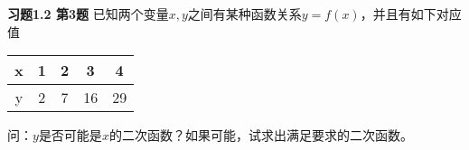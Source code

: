 
\renewcommand{\newpageorvspace}{\newpage}

\date{2022-09-09  第一次习题课}
\author{}



\maketitle

\larger[2]

{\bf 习题1.2 第3题} 已知两个变量$x,y$之间有某种函数关系$y=f(x)$，并且有如下对应值
\begin{table}[H]
    \centering
    \begin{tabular}{|c|c|c|c|c|}
    \toprule
         x & 1 & 2 & 3 & 4 \\ \hline
         y & 2 & 7 & 16 & 29 \\
    \bottomrule
    \end{tabular}
\end{table}
问：$y$是否可能是$x$的二次函数？如果可能，试求出满足要求的二次函数。

\newpageorvspace


